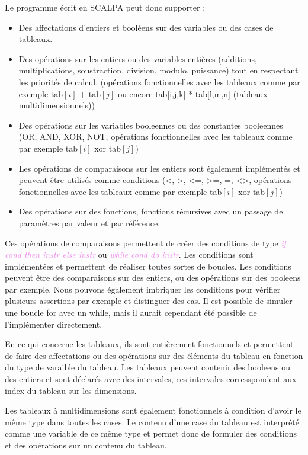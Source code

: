 \documentclass[a4paper]{article}
\let\oldtextit\textit
\renewcommand{\textit}[1]{\textcolor{violet}{\oldtextit{#1}}}
\begin{document}
Le programme écrit en SCALPA peut donc supporter :
\begin{itemize}
    \item Des affectations d'entiers et booléens sur des variables ou des cases de tableaux.
    \item Des opérations sur les entiers ou des variables entières (additions, multiplications, soustraction, division, modulo, puissance) tout en respectant les priorités de calcul. (opérations fonctionnelles avec les tableaux comme par exemple tab$[i]$ + tab$[j]$ ou encore tab[i,j,k] * tab[l,m,n] (tableaux multidimensionnels))
    \item Des opérations sur les variables booleennes ou des constantes booleennes (OR, AND, XOR, NOT, opérations fonctionnelles avec les tableaux comme par exemple tab$[i]$ xor tab$[j]$)
    \item Les opérations de comparaisons sur les entiers sont également implémentés et peuvent être utilisés comme conditions (<, >, <=, >=, =, <>, opérations fonctionnelles avec les tableaux comme par exemple tab$[i]$ xor tab$[j]$)
    \item Des opérations sur des fonctions, fonctions récursives avec un passage de paramètres par valeur et par référence.

\end{itemize}

Ces opérations de comparaisons permettent de créer des conditions de type \textit{if cond then instr else instr } ou \textit{while cond do instr}. Les conditions sont implémentées et permettent de réaliser toutes sortes de boucles. Les conditions peuvent être des comparaisons sur des entiers, ou des opérations sur des booleens par exemple.
Nous pouvons également imbriquer les conditions pour vérifier plusieurs assertions par exemple et distinguer des cas.
Il est possible de simuler une boucle for avec un while, mais il aurait cependant été possible de l'implémenter directement.

En ce qui concerne les tableaux, ils sont entièrement fonctionnels et permettent de faire des affectations ou des opérations sur des éléments du tableau en fonction du type de varaible du tableau. Les tableaux peuvent contenir des booleens ou des entiers et sont déclarés avec des intervales, ces intervales corresspondent aux index du tableau sur les dimensions.

Les tableaux à multidimensions sont également fonctionnels à condition d'avoir le même type dans toutes les cases. Le contenu d'une case du tableau est interprété comme une variable de ce même type et permet donc de formuler des conditions et des opérations sur un contenu du tableau.
\end{document}
